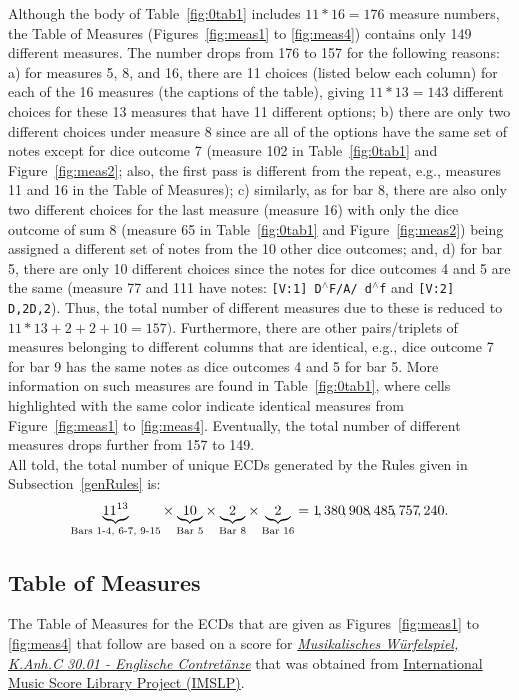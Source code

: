 \documentclass[letterpaper,x11names,svgnames,10pt]{article}
\begin{document}
Although the body of Table~\ref{fig:0tab1} includes $11*16 = 176$ measure numbers, the Table of Measures (Figures~\ref{fig:meas1} to \ref{fig:meas4}) contains only 149 different measures.  The number drops from 176 to 157 for the following reasons: a) for measures 5, 8, and 16, there are 11 choices (listed below each column) for each of the 16 measures (the captions of the table), giving $11*13=143$ different choices for these 13 measures that have 11 different options; b) there are only two different choices under measure 8 since are all of the options have the same set of notes except for dice outcome 7 (measure 102 in Table~\ref{fig:0tab1} and Figure~\ref{fig:meas2};  also, the first pass is different from the repeat, e.g., measures 11 and 16 in the Table of Measures); c) similarly, as for bar 8, there are also only two different choices for the last measure (measure 16) with only the dice outcome of sum 8 (measure 65 in Table~\ref{fig:0tab1} and Figure~\ref{fig:meas2}) being assigned a different set of notes from the 10 other dice outcomes; and, d) for bar 5, there are only 10 different choices since the notes for dice outcomes 4 and 5 are the same (measure 77 and 111 have notes: {\tt [V:1] D$^\wedge$F/A/ d$^\wedge$f} and {\tt [V:2] D,2D,2}).  Thus, the total number of different measures due to these is reduced to $11*13 + 2 + 2 + 10 = 157)$. Furthermore, there are other pairs/triplets of measures belonging to different columns that are identical, e.g., dice outcome 7 for bar 9 has the same notes as dice outcomes 4 and 5 for bar 5.  More information on such measures are found in Table~\ref{fig:0tab1}, where cells highlighted with the same color indicate identical measures from Figure~\ref{fig:meas1} to \ref{fig:meas4}. Eventually, the total number of different measures drops further from 157 to 149. \\

All told, the total number of unique ECDs generated by the Rules given in Subsection~\ref{genRules} is: $$ \underbrace{11^{13}}_{\tiny\text{Bars 1-4, 6-7, 9-15}} \times \underbrace{10}_{\tiny\text{Bar 5}} \times \underbrace{2}_{\tiny\text{Bar 8}} \times \underbrace{2}_{\tiny\text{Bar 16}} = 1\!,380\!,908\!,485\!,757\!,240.$$
 
\subsection{Table of Measures}

The Table of Measures for the ECDs that are given as Figures~\ref{fig:meas1} to \ref{fig:meas4} that follow are based on a score for \href{https://imslp.org/wiki/Musikalische_W\%C3\%BCrfelspiele\%2C_K.Anh.C.30.01_(Mozart\%2C_Wolfgang_Amadeus)}{\em Musikalisches W\"{u}rfelspiel, K.Anh.C 30.01 - Englische Contret\"{a}nze} that was obtained from \href{http://imslp.org/}{International Music Score Library Project (IMSLP)}.  
\end{document}
